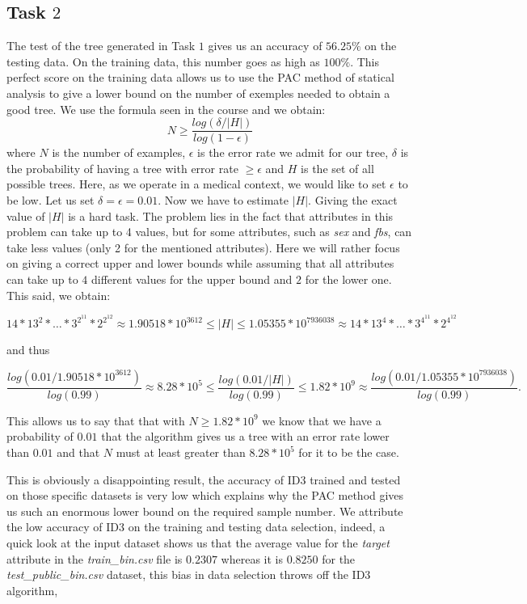 \documentclass[french]{article}
\begin{document}
\subsection{Task $2$}
	The test of the tree generated in Task $1$ gives us an accuracy of $56.25\%$ on the testing data. On the training data, this number goes as high as $100\%$. This perfect score on the training data allows us to use the PAC method of statical analysis to give a lower bound on the number of exemples needed to obtain a good tree. We use the formula seen in the course and we obtain:
	$$N\geq\frac{log(\delta/|H|)}{log(1-\epsilon)}$$
where $N$ is the number of examples, $\epsilon$ is the error rate we admit for our tree, $\delta$ is the probability of having a tree with error rate $\geq\epsilon$ and $H$ is the set of all possible trees. Here, as we operate in a medical context, we would like to set $\epsilon$  to be low. Let us set $\delta=\epsilon= 0.01$. Now we have to estimate $|H|$. Giving the exact value of $|H|$ is a hard task. The problem lies in the fact that attributes in this problem can take up to 4 values, but for some attributes, such as \emph{sex} and \emph{fbs}, can take less values (only 2 for the mentioned attributes). Here we will rather focus on giving a correct upper and lower bounds while assuming that all attributes can take up to $4$ different values for the upper bound and $2$ for the lower one. This said, we obtain:
	
	$$14*13^2*\ldots*3^{2^{11}}*2^{2^{12}}\approx1.90518*10^{3612}\leq|H|\leq 1.05355*10^{7936038}\approx 14*13^4*\ldots*3^{4^{11}}*2^{4^{12}}  $$
	
	and thus 
	
	$$\frac{log(0.01/1.90518*10^{3612})}{log(0.99)}\approx8.28*10^5\leq\frac{log(0.01/|H|)}{log(0.99)}\leq1.82*10^9\approx\frac{log(0.01/1.05355*10^{7936038})}{log(0.99)}.$$

This allows us to say that that with $N\geq1.82*10^9$ we know that we have a probability of $0.01$ that the algorithm gives us a tree with an error rate lower than $0.01$ and that $N$ must at least greater than $8.28*10^5$ for it to be the case.

This is obviously a disappointing result, the accuracy of ID3 trained and tested on those specific datasets is very low which explains why the PAC method gives us such an enormous lower bound on the required sample number. We attribute the low accuracy of ID3 on the training and testing data selection, indeed, a quick look at the input dataset shows us that the average value for the \emph{target} attribute in the \emph{train\_bin.csv} file is $0.2307$ whereas it is $0.8250$ for the \emph{test\_public\_bin.csv} dataset, this bias in data selection throws off the ID3 algorithm, %
\end{document}
